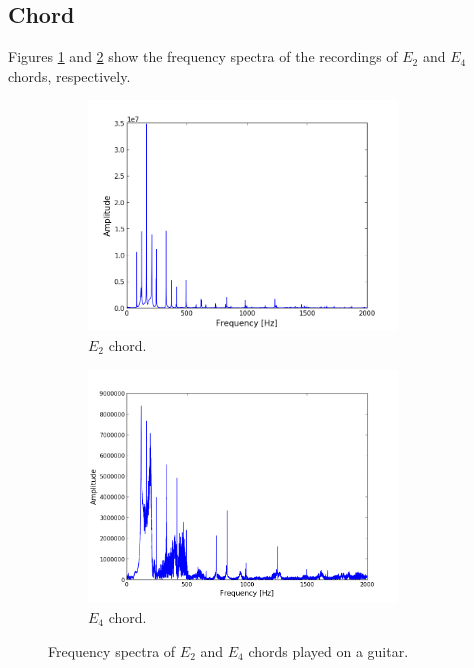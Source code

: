 \subsection{Chord}
Figures \ref{fig:chord_low} and \ref{fig:chord_high} show the frequency spectra of the recordings of  $E_2$ and $E_4$ chords, respectively.
\begin{figure}[H]
\centering
\begin{subfigure}{0.49\textwidth}
\centering
\includegraphics[width=0.9\textwidth]{figures/freqanal/chord_low.png}
\caption{$E_2$ chord.}
\label{fig:chord_low}
\end{subfigure}
\begin{subfigure}{0.49\textwidth}
\centering
\includegraphics[width = 0.9\textwidth]{figures/freqanal/chord_high.png}
\caption{$E_4$ chord.}
\label{fig:chord_high}
\end{subfigure}
\caption{Frequency spectra of $E_2$ and $E_4$ chords played on a guitar.}
\label{fig:chord}
\end{figure}

